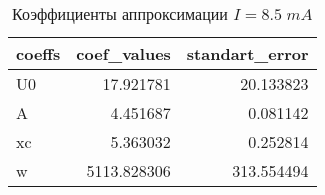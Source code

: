 \begin{table}[h]
\centering
\caption{Коэффициенты аппроксимации $I=8.5\; mA$}
\label{coeffs_table}
\begin{tabular}{lrr}
\toprule
coeffs &  coef\_values &  standart\_error \\
\midrule
    U0 &    17.921781 &       20.133823 \\
     A &     4.451687 &        0.081142 \\
    xc &     5.363032 &        0.252814 \\
     w &  5113.828306 &      313.554494 \\
\bottomrule
\end{tabular}
\end{table}

